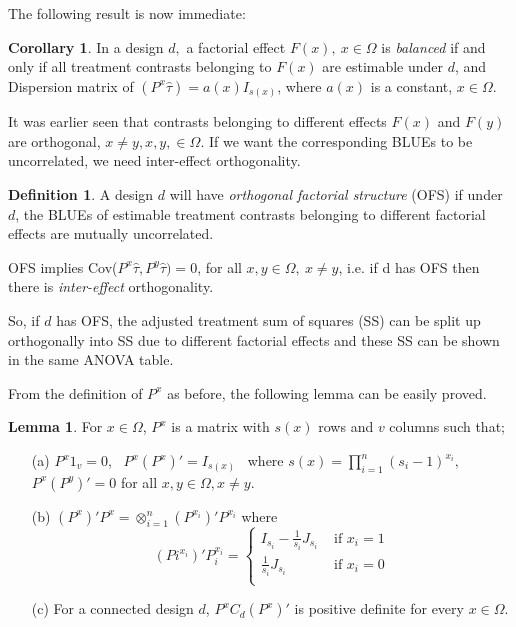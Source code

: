 \documentclass[12pt]{article}
\theoremstyle{definition}
\newtheorem{lem}{Lemma}
\newtheorem{cor}{Corollary}
\newtheorem{defn}{Definition}
\newenvironment{definition}{
\begin{tcolorbox}[colback=green!5!white,colframe=green!75!black, parbox = false]\begin{defn} }{\end{defn}\end{tcolorbox} }
\newenvironment{lemma}{
\begin{tcolorbox}[colback=green!5!white,colframe=green!75!black, parbox = false]\begin{lem} }{\end{lem}\end{tcolorbox} }
\newenvironment{corollary}{
\begin{tcolorbox}[colback=blue!5!white,colframe=blue!75!black, parbox = false]\begin{cor} }{\end{cor}\end{tcolorbox} }
\begin{document}
The following result is now immediate:

\begin{corollary}
    In a design $d,$ a factorial effect $F(x), \ x\in \Omega$ is  \textit{balanced} if and only if all treatment contrasts belonging to $F(x)$ are estimable under $d$, and Dispersion matrix of $(P^x\hat{\tau} ) = a(x) I_{s(x)}$, where $a(x)$ is a constant, $x \in \Omega$.
\end{corollary}

It was earlier seen that contrasts belonging to different effects $F(x)$ and $F(y)$ are orthogonal,  $x\neq y, x,y,\in \Omega$. If we want the corresponding BLUEs to be uncorrelated, we need inter-effect orthogonality.

\begin{definition}
    A design $d$ will have \textit{orthogonal factorial structure} (OFS) if under $d$, the BLUEs of estimable treatment contrasts belonging to different factorial effects are mutually uncorrelated.
\end{definition}


OFS implies Cov($P^x \hat{\tau}, P^y \hat{\tau})= 0 $, for all $x, y \in \Omega, \ x\neq y$, i.e. if d has OFS then there is \textit{inter-effect} orthogonality.

So, if $d$ has OFS, the adjusted treatment sum of squares (SS)  can be split up orthogonally into SS due to different factorial effects and these SS
can be shown in the same ANOVA table.

From the definition of $P^x$ as before, the following lemma can be easily proved. 

\begin{lemma}
    \label{lemma:OFS-px}
    For $x \in \Omega$, $P^x$ is a  matrix with $s(x)$ rows and $v$ columns such that;
    \begin{enumerate}
        \item[(a)]  $P^x 1_v = 0$, \ $P^x (P^x)'=I_{s(x)}$ \  where $s(x) =\prod_{i=1}^n(s_i-1)^{x_i}, $ $P^x(P^y)' = 0$ for all $x,y \in \Omega, x\neq y$. 
        \item[(b)] $(P^x)'P^x = \otimes_{i=1}^n (P^{x_i})' P^{x_i}$ where 
        $$  (Pi^{x_i})'P_i^{x_i} =
        \begin{cases}
            I_{s_i} - \frac{1}{s_i}J_{s_i} & \text{ if } x_i= 1\\
            \frac{1}{s_i}J_{s_i} & \text{ if } x_i = 0\\
        \end{cases}$$
        \item[(c)] For a connected design $d$,   $P^x C_d (P^x)'$ is positive definite for every $x \in \Omega$.
    \end{enumerate}
\end{lemma}
\end{document}
